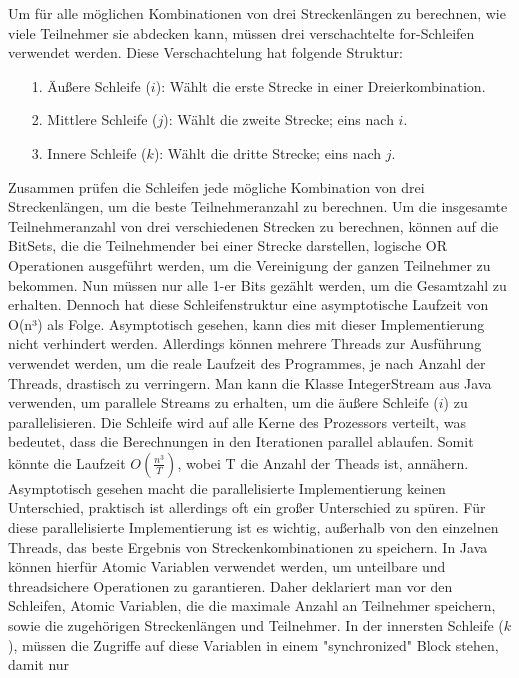 \documentclass[a4paper,10pt,ngerman]{scrartcl}
\begin{document}
\begin{itemize}
  \newline
  Um für alle möglichen Kombinationen von drei Streckenlängen zu berechnen, wie viele Teilnehmer sie abdecken kann, müssen drei verschachtelte for-Schleifen verwendet werden. Diese Verschachtelung hat folgende Struktur:
  \begin{itemize}
    \item [1.] Äußere Schleife ($i$): Wählt die erste Strecke in einer Dreierkombination.
    \item [2.] Mittlere Schleife ($j$): Wählt die zweite Strecke; eins nach $i$.
    \item [3.] Innere Schleife ($k$): Wählt die dritte Strecke; eins nach $j$.
  \end{itemize}
  Zusammen prüfen die Schleifen jede mögliche Kombination von drei Streckenlängen, um die beste Teilnehmeranzahl zu berechnen. Um die insgesamte Teilnehmeranzahl von drei verschiedenen Strecken zu berechnen, können auf die BitSets, die die Teilnehmender bei einer Strecke darstellen, logische OR Operationen ausgeführt werden,
  um die Vereinigung der ganzen Teilnehmer zu bekommen. Nun müssen nur alle 1-er Bits gezählt werden, um die Gesamtzahl zu erhalten. 
  \newline
  Dennoch hat diese Schleifenstruktur eine asymptotische Laufzeit von O(n³) als Folge. Asymptotisch gesehen, kann dies mit dieser Implementierung nicht verhindert werden. Allerdings können mehrere Threads zur Ausführung verwendet werden, um die reale Laufzeit des Programmes, je nach Anzahl der Threads, drastisch zu verringern.
  Man kann die Klasse IntegerStream aus Java verwenden, um parallele Streams zu erhalten, um die äußere Schleife ($i$) zu parallelisieren. Die Schleife wird auf alle Kerne des Prozessors verteilt, was bedeutet, dass die Berechnungen in den Iterationen parallel ablaufen. Somit könnte die Laufzeit $O(\frac{n^3}{T})$, wobei T die Anzahl
  der Theads ist, annähern. Asymptotisch gesehen macht die parallelisierte Implementierung keinen Unterschied, praktisch ist allerdings oft ein großer Unterschied zu spüren.
  \newline
  Für diese parallelisierte Implementierung ist es wichtig, außerhalb von den einzelnen Threads, das beste Ergebnis von Streckenkombinationen zu speichern. In Java können hierfür Atomic Variablen verwendet werden, um unteilbare und threadsichere Operationen zu garantieren. 
  Daher deklariert man vor den Schleifen, Atomic Variablen, die die maximale Anzahl an Teilnehmer speichern, sowie die zugehörigen Streckenlängen und Teilnehmer. In der innersten Schleife ($k$), müssen die Zugriffe auf diese Variablen in einem "synchronized" Block stehen, damit nur

\end{itemize}
\end{document}
